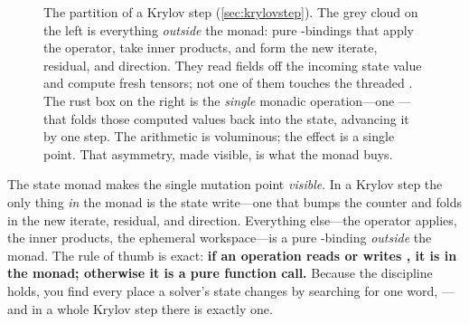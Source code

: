 \begin{figure}[t]
\centering
{}
\caption[In the monad versus outside it]{The partition of a Krylov step
(\cref{sec:krylovstep}). The grey cloud on the left is everything \emph{outside} the
monad: pure -bindings that apply the operator, take inner products, and form
the new iterate, residual, and direction. They read fields off the incoming state
value and compute fresh tensors; not one of them touches the threaded .
The rust box on the right is the \emph{single} monadic operation---one
---that folds those computed values back into the state, advancing it by
one step. The arithmetic is voluminous; the effect is a single point. That asymmetry,
made visible, is what the monad buys.}
\label{fig:partition}
\end{figure}

\begin{keyidea}
The state monad makes the single mutation point \emph{visible}. In a Krylov step the
only thing \emph{in} the monad is the state write---one  that bumps the
counter and folds in the new iterate, residual, and direction. Everything else---the
operator applies, the inner products, the ephemeral workspace---is a pure
-binding \emph{outside} the monad. The rule of thumb is exact: \textbf{if an
operation reads or writes , it is in the monad; otherwise it is a pure
function call.} Because the discipline holds, you find every place a solver's state
changes by searching for one word, ---and in a whole Krylov step there
is exactly one.
\end{keyidea}


